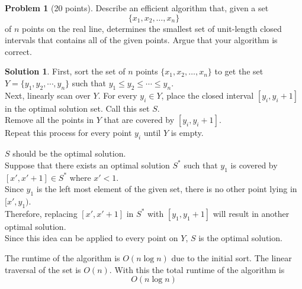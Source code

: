 \documentclass{article}
\theoremstyle{definition}
\newtheorem{problem}{Problem}
\newtheorem*{solution}{Solution}
\begin{document}
\clearpage
\begin{problem}[20 points]
  Describe an efficient algorithm that, given a set
  $$\{ x_1, x_2, \ldots, x_n\}$$ of $n$ points on the real line,
  determines the smallest set of unit-length closed intervals that
  contains all of the given points. Argue that your algorithm is
  correct.
\end{problem}
\begin{solution}
First, sort the set of $n$ points $\{ x_1, x_2, \ldots, x_n\}$ to get the set $Y=\{y_1, y_2, \cdots, y_n\}$ such that $y_1\leq y_2\leq\cdots\leq y_n$.\\
Next, linearly scan over $Y$. For every $y_i\in Y$, place the closed interval $[y_i,y_i+1]$ in the optimal solution set. Call this set $S$.\\
Remove all the points in $Y$ that are covered by $[y_i,y_i+1]$.\\
Repeat this process for every point $y_i$ until $Y$ is empty.

\noindent
$S$ should be the optimal solution.\\
Suppose that there exists an optimal solution $S^*$ such that $y_1$ is covered by $[x',x'+1]\in S^*$ where $x'<1$.\\
Since $y_1$ is the left most element of the given set, there is no other point lying in $[x',y_1)$.\\
Therefore, replacing $[x',x'+1]$ in $S^*$ with $[y_1,y_1+1]$ will result in another optimal solution.\\
Since this idea can be applied to every point on $Y$, $S$ is the optimal solution.

\noindent
The runtime of the algorithm is $O(n\log n)$ due to the initial sort. The linear traversal of the set is $O(n)$. With this the total runtime of the algorithm is
\[O(n\log n)\]
\end{solution}
\end{document}
